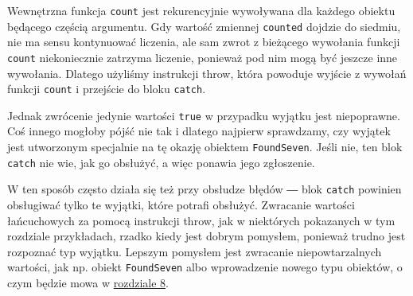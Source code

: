 Wewnętrzna funkcja \texttt{count} jest rekurencyjnie wywoływana dla każdego obiektu będącego częścią argumentu. Gdy wartość zmiennej \texttt{counted} dojdzie do siedmiu, nie ma sensu kontynuować liczenia, ale sam zwrot z bieżącego wywołania funkcji \texttt{count} niekoniecznie zatrzyma liczenie, ponieważ pod nim mogą być jeszcze inne wywołania. Dlatego użyliśmy instrukcji throw, która powoduje wyjście z wywołań funkcji \texttt{count} i przejście do bloku \texttt{catch}.

  
Jednak zwrócenie jedynie wartości \texttt{true} w przypadku wyjątku jest niepoprawne. Coś innego mogłoby pójść nie tak i dlatego najpierw sprawdzamy, czy wyjątek jest utworzonym specjalnie na tę okazję obiektem \texttt{FoundSeven}. Jeśli nie, ten blok \texttt{catch} nie wie, jak go obsłużyć, a więc ponawia jego zgłoszenie.

  
W ten sposób często działa się też przy obsłudze błędów ― blok \texttt{catch} powinien obsługiwać tylko te wyjątki, które potrafi obsłużyć. Zwracanie wartości łańcuchowych za pomocą instrukcji throw, jak w niektórych pokazanych w tym rozdziale przykładach, rzadko kiedy jest dobrym pomysłem, ponieważ trudno jest rozpoznać typ wyjątku. Lepszym pomysłem jest zwracanie niepowtarzalnych wartości, jak np. obiekt \texttt{FoundSeven} albo wprowadzenie nowego typu obiektów, o czym będzie mowa w \hyperref[chap:8]{rozdziale 8}.